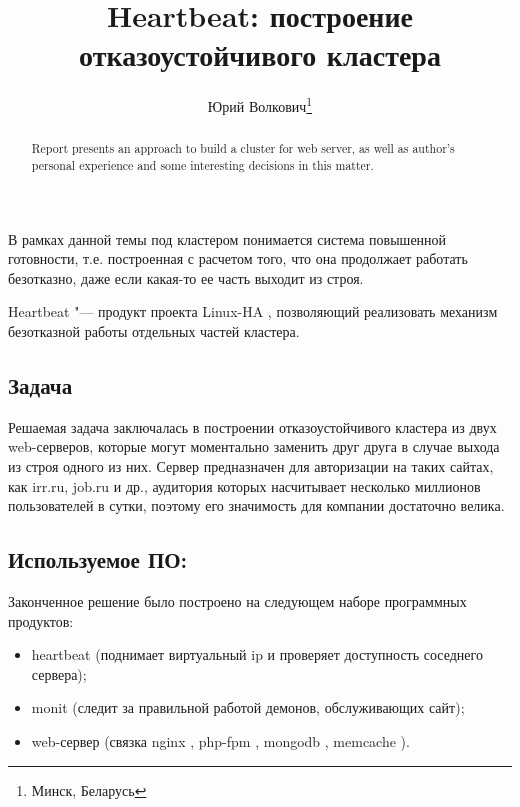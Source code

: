 \documentclass[10pt, a5paper]{article}
\begin{document}
\title{Heartbeat: построение отказоустойчивого кластера}%

\author{Юрий Волкович\footnote{Минск, Беларусь}}
\maketitle

\begin{abstract}
Report presents an approach to build a cluster for web server, as well as author's personal experience and some interesting decisions in this matter.
\end{abstract}

В рамках данной темы под кластером понимается система повышенной готовности, т.е. построенная с расчетом того, что она продолжает работать безотказно, даже если какая-то ее часть выходит из строя.

Heartbeat "--- продукт проекта Linux-HA \cite{Volkovich1}, позволяющий реализовать механизм безотказной работы отдельных частей кластера.

\subsection*{Задача}

Решаемая задача заключалась в построении отказоустойчивого кластера из двух web-серверов, которые могут моментально заменить друг друга в случае выхода из строя одного из них. Сервер предназначен для авторизации на таких сайтах, как irr.ru, job.ru и др., аудитория которых насчитывает несколько миллионов пользователей в сутки, поэтому его значимость для компании достаточно велика.

\subsection*{Используемое ПО:}

Законченное решение было построено на следующем наборе программных продуктов:

\begin{itemize}
  \item heartbeat (поднимает виртуальный ip и проверяет доступность соседнего сервера);
  \item monit \cite{Volkovich2} (следит за правильной работой демонов, обслуживающих сайт);
  \item web-сервер (связка nginx \cite{Volkovich3}, php-fpm \cite{Volkovich4}, mongodb \cite{Volkovich5}, memcache \cite{Volkovich6}).
\end{itemize}
\end{document}
